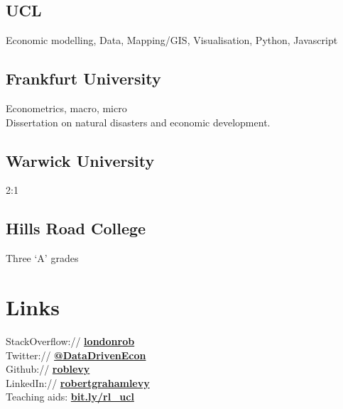 \documentclass[a4paper,nomath]{deedy-resume} %
\begin{document}
\begin{minipage}[t]{0.3\textwidth}
    \subsection{UCL}
    
    Economic modelling, Data, Mapping/GIS, Visualisation, Python, Javascript
    \sectionspace

    \subsection{Frankfurt University}

    Econometrics, macro, micro\\
    Dissertation on natural disasters and economic development.
    \sectionspace %

    \subsection{Warwick University}
    2:1
    \sectionspace %


    \subsection{Hills Road College}
    Three `A' grades\\
    \sectionspace %


    \section{Links} 

    StackOverflow:// \href{http://stackoverflow.com/londonrob}{\bf londonrob} \\
    Twitter:// \href{http://twitter.com/datadrivenecon}{\bf @DataDrivenEcon} \\
    Github:// \href{https://github.com/roblevy}{\bf roblevy} \\
    LinkedIn:// \href{http://uk.linkedin.com/in/robertgrahamlevy}{\bf robertgrahamlevy} \\
    \sectionspace
    Teaching aids: \href{http://www.homepages.ucl.ac.uk/~ucfnlev/}{\bf bit.ly/rl\_ucl}

    \sectionspace %


\end{minipage} %
\end{document}

